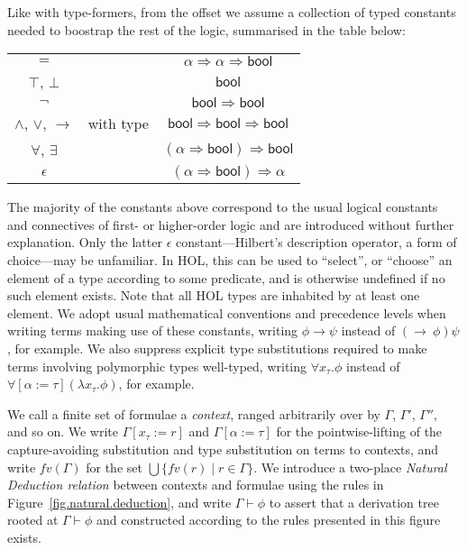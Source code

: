 \documentclass[a4paper, UKenglish, cleveref, autoref, thm-restate]{lipics-v2021}
\newcommand{\fall}[1]{\forall{#1}.}
\newcommand{\lam}[1]{\lambda{#1}.}
\begin{document}
Like with type-formers, from the offset we assume a collection of typed constants needed to boostrap the rest of the logic, summarised in the table below:
\begin{center}
\begin{tabular}{ccc}
$=$ & & $\alpha \Rightarrow \alpha \Rightarrow \mathsf{bool}$ \\
$\top$, $\bot$ & & $\mathsf{bool}$ \\
$\neg$ & & $\mathsf{bool} \Rightarrow \mathsf{bool}$ \\
$\wedge$, $\vee$, $\longrightarrow$ & \qquad with type \qquad & $\mathsf{bool} \Rightarrow \mathsf{bool} \Rightarrow \mathsf{bool}$ \\
$\forall$, $\exists$ & & $(\alpha \Rightarrow \mathsf{bool}) \Rightarrow \mathsf{bool}$ \\
$\epsilon$ & & $(\alpha \Rightarrow \mathsf{bool}) \Rightarrow \mathsf{\alpha}$
\end{tabular}
\end{center}
The majority of the constants above correspond to the usual logical constants and connectives of first- or higher-order logic and are introduced without further explanation.
Only the latter $\epsilon$ constant---Hilbert's description operator, a form of choice---may be unfamiliar.
In HOL, this can be used to ``select'', or ``choose'' an element of a type according to some predicate, and is otherwise undefined if no such element exists.
Note that all HOL types are inhabited by at least one element.
We adopt usual mathematical conventions and precedence levels when writing terms making use of these constants, writing $\phi \longrightarrow \psi$ instead of $(\longrightarrow\ \phi)\psi$, for example.
We also suppress explicit type substitutions required to make terms involving polymorphic types well-typed, writing $\fall{x_\tau}\phi$ instead of $\forall[\alpha := \tau](\lam{x_\tau}\phi)$, for example.

We call a finite set of formulae a \emph{context}, ranged arbitrarily over by $\Gamma$, $\Gamma'$, $\Gamma''$, and so on.
We write $\Gamma[x_\tau := r]$ and $\Gamma[\alpha := \tau]$ for the pointwise-lifting of the capture-avoiding substitution and type substitution on terms to contexts, and write $fv(\Gamma)$ for the set $\bigcup \{ fv(r) \mid r \in \Gamma \}$.
We introduce a two-place \emph{Natural Deduction relation} between contexts and formulae using the rules in Figure~\ref{fig.natural.deduction}, and write $\Gamma \vdash \phi$ to assert that a derivation tree rooted at $\Gamma \vdash \phi$ and constructed according to the rules presented in this figure exists.
\end{document}
